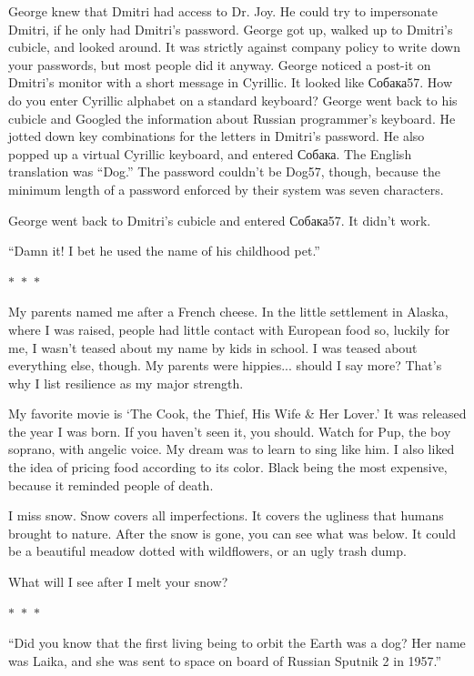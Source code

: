\documentclass{memoir}
\newcommand{\starbreak}{%
\begin{center}
  $\ast$~$\ast$~$\ast$
\end{center}
}
\begin{document}
George knew that Dmitri had access to Dr. Joy. He could try to impersonate Dmitri, if he only had Dmitri's password. George got up, walked up to Dmitri's cubicle, and looked around. It was strictly against company policy to write down your passwords, but most people did it anyway. George noticed a post-it on Dmitri's monitor with a short message in Cyrillic. It looked like \foreignlanguage{russian}{Собака57}. How do you enter Cyrillic alphabet on a standard keyboard? George went back to his cubicle and Googled the information about Russian programmer's keyboard. He jotted down key combinations for the letters in Dmitri's password. He also popped up a virtual Cyrillic keyboard, and entered \foreignlanguage{russian}{Собака}. The English translation was ``Dog.'' The password couldn't be Dog57, though, because the minimum length of a password enforced by their system was seven characters. 

George went back to Dmitri's cubicle and entered \foreignlanguage{russian}{Собака57}. It didn't work. 

``Damn it! I bet he used the name of his childhood pet.''

\starbreak

My parents named me after a French cheese. In the little settlement in Alaska, where I was raised, people had little contact with European food so, luckily for me, I wasn't teased about my name by kids in school. I was teased about everything else, though. My parents were hippies... should I say more? That's why I list resilience as my major strength.

My favorite movie is `The Cook, the Thief, His Wife \& Her Lover.' It was released the year I was born. If you haven't seen it, you should. Watch for Pup, the boy soprano, with angelic voice. My dream was to learn to sing like him. I also liked the idea of pricing food according to its color. Black being the most expensive, because it reminded people of death.

I miss snow. Snow covers all imperfections. It covers the ugliness that humans brought to nature. After the snow is gone, you can see what was below. It could be a beautiful meadow dotted with wildflowers, or an ugly trash dump. 

What will I see after I melt your snow?

\starbreak

``Did you know that the first living being to orbit the Earth was a dog? Her name was Laika, and she was sent to space on board of Russian Sputnik 2 in 1957.''
\end{document}

